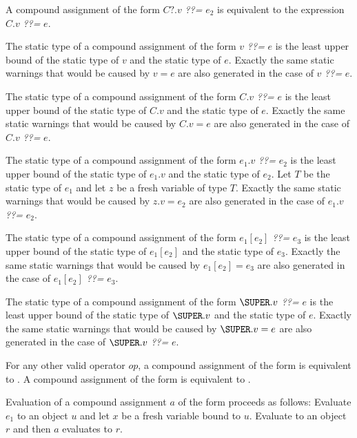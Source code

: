 \documentclass{article}
\begin{document}

\LMHash{}
A compound assignment of the form $C?.v$ {\em ??=} $e_2$ is equivalent to the expression $C.v$ {\em ??=} $e$.

\LMHash{}
The static type of a compound assignment of the form $v$ {\em ??=} $e$ is the least upper bound of the static type of $v$ and the static type of $e$.
Exactly the same static warnings that would be caused by $v = e$ are also generated in the case of $v$ {\em ??=} $e$.

\LMHash{}
The static type of a compound assignment of the form $C.v$ {\em ??=} $e$ is the least upper bound of the static type of $C.v$ and the static type of $e$.
Exactly the same static warnings that would be caused by $C.v = e$ are also generated in the case of $C.v$ {\em ??=} $e$.

\LMHash{}
The static type of a compound assignment of the form $e_1.v$ {\em ??=} $e_2$ is the least upper bound of the static type of $e_1.v$ and the static type of $e_2$.
Let $T$ be the static type of $e_1$ and let $z$ be a fresh variable of type $T$.
Exactly the same static warnings that would be caused by $z.v = e_2$ are also generated in the case of $e_1.v$ {\em ??=} $e_2$.

\LMHash{}
The static type of a compound assignment of the form $e_1[e_2]$ {\em ??=} $e_3$ is the least upper bound of the static type of $e_1[e_2]$ and the static type of $e_3$.
Exactly the same static warnings that would be caused by $e_1[e_2] = e_3$ are also generated in the case of $e_1[e_2]$ {\em ??=} $e_3$.

\LMHash{}
The static type of a compound assignment of the form $\SUPER.v$ {\em ??=} $e$ is the least upper bound of the static type of $\SUPER.v$ and the static type of $e$.
Exactly the same static warnings that would be caused by $\SUPER.v = e$ are also generated in the case of $\SUPER.v$ {\em ??=} $e$.

\LMHash{}
For any other valid operator $op$, a compound assignment of the form  is equivalent to .
A compound assignment of the form  is equivalent to .

\LMHash{}
Evaluation of a compound assignment $a$ of the form  proceeds as follows:
Evaluate $e_1$ to an object $u$ and let $x$ be a fresh variable bound to $u$.
Evaluate  to an object $r$
and then $a$ evaluates to $r$.
\end{document}
